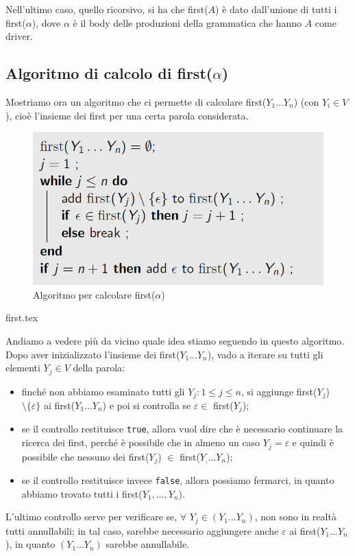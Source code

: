 \documentclass[class=book, crop=false, oneside, 12pt]{standalone}
\begin{document}
    Nell'ultimo caso, quello ricorsivo, si ha che first(\(A\)) è dato dall'unione di tutti i first(\(\alpha\)), dove \(\alpha\) è il body delle produzioni della grammatica che hanno \(A\) come driver.

\subsection{Algoritmo di calcolo di first(\(\alpha\))}

Mostriamo ora un algoritmo che ci permette di calcolare first(\(Y_1 \ldots Y_n\)) (con \(Y_i \in V\)), cioè l'insieme dei first per una certa parola considerata.

\begin{figure}[H]
    \centering
    \includegraphics[width=.7\textwidth,keepaspectratio]{first-algorithm.png}
    \caption{Algoritmo per calcolare first(\(\alpha\))}
    \label{first-algorithm}
\end{figure}
{first.tex}

Andiamo a vedere più da vicino quale idea stiamo seguendo in questo algoritmo. Dopo aver inizializzato l'insieme dei first(\(Y_1 \ldots Y_n\)), vado a iterare su tutti gli elementi \(Y_j \in V\) della parola: 
\begin{itemize}
    \item finché non abbiamo esaminato tutti gli \(Y_j : 1 \leq j \leq n\), si aggiunge first(\(Y_j\)) \(\setminus\{\varepsilon\}\) ai first(\(Y_1 \ldots Y_n\)) e poi si controlla se \(\varepsilon \in\) first(\(Y_j\));
    \item se il controllo restituisce \texttt{true}, allora vuol dire che è necessario continuare la ricerca dei first, perché è possibile che in almeno un caso \(Y_j = \varepsilon\) e quindi è possibile che nessuno dei first(\(Y_j\)) \(\in\) first(\(Y_, \ldots Y_n\));
    \item se il controllo restituisce invece \texttt{false}, allora possiamo fermarci, in quanto abbiamo trovato tutti i first(\(Y_1, \ldots, Y_n\)).
\end{itemize} 
L'ultimo controllo serve per verificare se, \(\forall\) \( Y_j \in (Y_1 \ldots Y_n)\), non sono in realtà tutti annullabili; in tal caso, sarebbe necessario aggiungere anche \(\varepsilon\) ai first(\(Y_1 \ldots Y_n\)), in quanto \((Y_1 \ldots Y_n)\) sarebbe annullabile.
\end{document}
